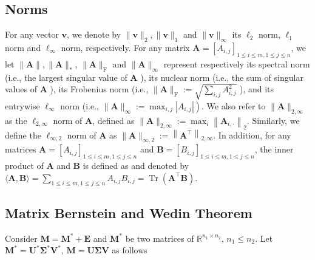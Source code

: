 \documentclass[12pt]{article}
\theoremstyle{remark}
\newcommand{\bs}[1]{{\boldsymbol{#1}^*}}
\newcommand{\bb}[1]{{\boldsymbol {#1}}}
\begin{document}
\subsection{Norms}
For any vector $\boldsymbol{v}$, we denote by $\|\boldsymbol{v}\|_2,\|\boldsymbol{v}\|_1$ and $\|\boldsymbol{v}\|_{\infty}$ its $\ell_2$ norm, $\ell_1$ norm and $\ell_{\infty}$ norm, respectively. For any matrix $\boldsymbol{A}=\left[A_{i, j}\right]_{1 \leq i \leq m, 1 \leq j \leq n}$, we let $\|\boldsymbol{A}\|,\|\boldsymbol{A}\|_*$, $\|\boldsymbol{A}\|_{\mathrm{F}}$ and $\|\boldsymbol{A}\|_{\infty}$ represent respectively its spectral norm (i.e., the largest singular value of $\boldsymbol{A}$ ), its nuclear norm (i.e., the sum of singular values of $\boldsymbol{A}$ ), its Frobenius norm (i.e., $\|\boldsymbol{A}\|_{\mathrm{F}}:=\sqrt{\sum_{i, j} A_{i, j}^2}$ ), and its entrywise $\ell_{\infty}$ norm (i.e., $\left.\|\boldsymbol{A}\|_{\infty}:=\max _{i, j}\left|A_{i, j}\right|\right)$. We also refer to $\|\boldsymbol{A}\|_{2, \infty}$ as the $\ell_{2, \infty}$ norm of $\boldsymbol{A}$, defined as $\|\boldsymbol{A}\|_{2, \infty}:=\max _i\left\|\boldsymbol{A}_{i, \cdot}\right\|_2$. Similarly, we define the $\ell_{\infty, 2}$ norm of $\boldsymbol{A}$ as $\|\boldsymbol{A}\|_{\infty, 2}:=\left\|\boldsymbol{A}^{\top}\right\|_{2, \infty}$. In addition, for any matrices $\boldsymbol{A}=\left[A_{i, j}\right]_{1 \leq i \leq m, 1 \leq j \leq n}$ and $\boldsymbol{B}=\left[B_{i, j}\right]_{1 \leq i \leq m, 1 \leq j \leq n}$, the inner product of $\boldsymbol{A}$ and $\boldsymbol{B}$ is defined as and denoted by $\langle\boldsymbol{A}, \boldsymbol{B}\rangle=\sum_{1 \leq i \leq m, 1 \leq j \leq n} A_{i, j} B_{i, j}=\operatorname{Tr}\left(\boldsymbol{A}^{\top} \boldsymbol{B}\right)$.


\subsection{Matrix Bernstein and Wedin Theorem}
Consider $\bb M = \bs M + \bb E$ and $\bs M$ be two matrices of $\mathbb R^{n_1\times n_2}$, $n_1\leq n_2$.
Let $\bs M = \bs U \bs \Sigma \bs V$, $\bb M = \bb U \bb \Sigma \bb V$ as follows
\end{document}

